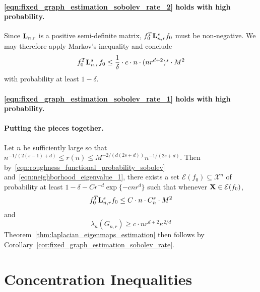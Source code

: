 \documentclass{article}
\newcommand{\1}{\mathbf{1}}
\newcommand{\Lap}{{\bf L}}
\newcommand{\Xset}{\mathcal{X}}
\theoremstyle{alden}
\theoremstyle{aldenthm}
\theoremstyle{definition}
\theoremstyle{remark}
\begin{document}
\paragraph{\eqref{eqn:fixed_graph_estimation_sobolev_rate_2} holds with high probability.}

Since $\Lap_{n,r}$ is a positive semi-definite matrix, $f_0^T \Lap_{{n,r}}^s f_0$ must be non-negative. We may therefore apply Markov's inequality and conclude
\begin{equation}
\label{eqn:roughness_functional_probability_sobolev}
f_0^T \Lap_{{n,r}}^s f_0 \leq  \frac{1}{\delta} \cdot c \cdot n \cdot (nr^{d+2})^s \cdot M^2
\end{equation}
with probability at least $1 - \delta$.

\paragraph{\eqref{eqn:fixed_graph_estimation_sobolev_rate_1} holds with high probability.}

\paragraph{Putting the pieces together.}

Let $n$ be sufficiently large so that $n^{-1/(2(s - 1)+ d)} \leq r(n) \leq M^{-2/(d(2s + d))} n^{-1/(2s + d)}$. Then by~\eqref{eqn:roughness_functional_probability_sobolev} and~\eqref{eqn:neighborhood_eigenvalue_1}, there exists a set $\mathcal{E}(f_0) \subseteq \Xset^n$ of probability at least $1 - \delta - Cr^{-d}\exp\{-cnr^d\}$ such that whenever ${\bf X} \in \mathcal{E}(f_0)$,
\begin{equation*}
f_0^T \Lap_{n,r}^s f_0 \leq C \cdot n \cdot C_n^s \cdot M^2
\end{equation*}
and
\begin{equation*}
\lambda_{\kappa}(G_{n,r}) \geq c \cdot nr^{d+2}\kappa^{2/d}
\end{equation*}
Theorem~\ref{thm:laplacian_eigenmaps_estimation} then follows by Corollary~\ref{cor:fixed_graph_estimation_sobolev_rate}.

\section{Concentration Inequalities}


 
\end{document}

